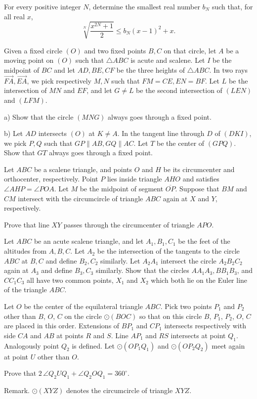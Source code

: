 \documentclass[11pt]{scrartcl}
\begin{document}
\begin{problem}[7500559455615129254]
For every positive integer $N$, determine the smallest real number $b_{N}$ such that, for all real $x$,
\[
\sqrt[N]{\frac{x^{2 N}+1}{2}} \leqslant b_{N}(x-1)^{2}+x .
\]
\end{problem}
\begin{problem}[5990443173263547430]
	Given a fixed circle $(O)$ and two fixed points $B, C$ on that circle, let $A$ be a moving point on $(O)$ such that $\triangle ABC$ is acute and scalene. Let $I$ be the midpoint of $BC$ and let $AD, BE, CF$ be the three heights of $\triangle ABC$. In two rays $\overrightarrow{FA}, \overrightarrow{EA}$, we pick respectively $M,N$ such that $FM = CE, EN = BF$. Let $L$ be the intersection of $MN$ and $EF$, and let $G \neq L$ be the second intersection of $(LEN)$ and $(LFM)$.

a) Show that the circle $(MNG)$ always goes through a fixed point.

b) Let $AD$ intersects $(O)$ at $K \neq A$. In the tangent line through $D$ of $(DKI)$, we pick $P,Q$ such that $GP \parallel AB, GQ \parallel AC$. Let $T$ be the center of $(GPQ)$. Show that $GT$ always goes through a fixed point.
\end{problem}
\begin{problem}[8053761138620448460]
	Let $ABC$ be a scalene triangle, and points $O$ and $H$ be its circumcenter and orthocenter, respectively. Point $P$ lies inside triangle $AHO$ and satisfies $\angle AHP = \angle POA$. Let $M$ be the midpoint of segment $\overline{OP}$. Suppose that $BM$ and $CM$ intersect with the circumcircle of triangle $ABC$ again at $X$ and $Y$, respectively.

Prove that line $XY$ passes through the circumcenter of triangle $APO$.
\end{problem}
\begin{problem}[8330669807899443473]
Let $ABC$ be an acute scalene triangle, and let $A_1, B_1, C_1$ be the feet of the altitudes from $A, B, C$. Let $A_2$ be the intersection of the tangents to the circle $ABC$ at $B, C$ and define $B_2, C_2$ similarly. Let $A_2A_1$ intersect the circle $A_2B_2C_2$ again at $A_3$ and define $B_3, C_3$ similarly. Show that the circles $AA_1A_3, BB_1B_3$, and $CC_1C_3$ all have two common points, $X_1$ and $X_2$ which both lie on the Euler line of the triangle $ABC$.
\end{problem}
\begin{problem}[518384374486289]
	Let $O$ be the center of the equilateral triangle $ABC$. Pick two points $P_1$ and $P_2$ other than $B$, $O$, $C$ on the circle $\odot(BOC)$ so that on this circle $B$, $P_1$, $P_2$, $O$, $C$ are placed in this order. Extensions of $BP_1$ and $CP_1$ intersects respectively with side $CA$ and $AB$ at points $R$ and $S$. Line $AP_1$ and $RS$ intersects at point $Q_1$. Analogously point $Q_2$ is defined. Let $\odot(OP_1Q_1)$ and $\odot(OP_2Q_2)$ meet again at point $U$ other than $O$.

Prove that $2\,\angle Q_2UQ_1 + \angle Q_2OQ_1 = 360^\circ$.

Remark. $\odot(XYZ)$ denotes the circumcircle of triangle $XYZ$.
\end{problem}
\end{document}
